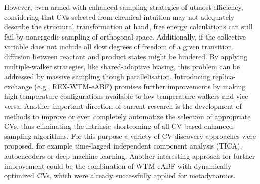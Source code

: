 However, even armed with enhanced-sampling strategies of utmost efficiency, considering that CVs selected from chemical intuition may not adequately describe the structural transformation at hand, free energy calculations can still fail by nonergodic sampling of orthogonal-space.
Additionally, if the collective variable does not include all slow degrees of freedom of a given transition, diffusion between reactant and product states might be hindered.
By applying multiple-walker strategies, like shared-adaptive biasing, this problem can be addressed by massive sampling though parallelisation.
Introducing replica-exchange (e.g., REX-WTM-eABF\autocite{fu2019taming}) promises further improvements by making high temperature configurations available to low temperature walkers and vice versa.
Another important direction of current research is the development of methods to improve or even completely automatize the selection of appropriate CVs, thus eliminating the intrinsic shortcoming of all CV based enhanced sampling algorithms.
For this purpose a variety of CV-discovery approaches were proposed, for example time-lagged independent component analysis (TICA)\autocite{perez2013identification}, autoencoders\autocite{reiter2019using} or deep machine learning\autocite{brandt2018machine,rydzewski2020multiscale}.
Another interesting approach for further improvement could be the combination of WTM-eABF with dynamically optimized CVs, which were already successfully applied for metadynamics.\autocite{brotzakis2018accelerating}
